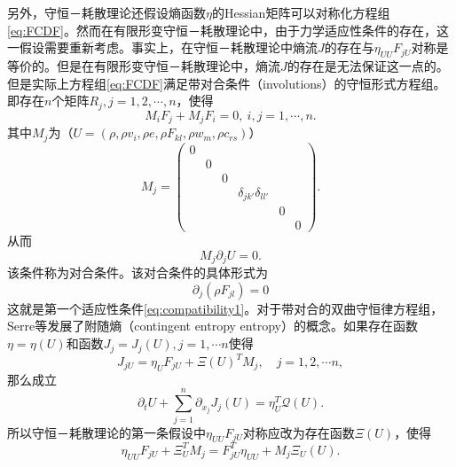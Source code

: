 
另外，守恒－耗散理论还假设熵函数$\eta$的Hessian矩阵可以对称化方程组\eqref{eq:FCDF}。然而在有限形变守恒－耗散理论中，由于力学适应性条件的存在，这一假设需要重新考虑。事实上，在守恒－耗散理论中熵流$J$的存在与$\eta_{UU}F_{jU}$对称是等价的。但是在有限形变守恒－耗散理论中，熵流$J$的存在是无法保证这一点的。但是实际上方程组\eqref{eq:FCDF}满足带对合条件（involutions）的守恒形式方程组\cite{dafermos1986quasilinear,dafermos2013non,benzoni2007multi}。即存在$n$个矩阵$R_j,j=1,2,\cdots,n$，使得
\begin{equation*}
	M_i F_{j} + M_j F_i = 0, \ i,j = 1, \cdots,n .
\end{equation*}
其中$M_j$为（$U= (\rho,\rho v_i,\rho e, \rho F_{kl},\rho w_m, \rho c_{rs})$）
\begin{equation*}
	M_{j} = \left( \begin{array}{ccccccc}
		0 \\
		& 0 \\
		& & 0 \\
		& & & \delta_{jk'}\delta_{ll'} \\
		& & & & 0 \\
		& & & & & 0
	\end{array} \right).
\end{equation*}
从而
\begin{equation}\label{eq:involutions}
	M_j \partial_j U = 0.
\end{equation}
该条件称为对合条件。该对合条件的具体形式为
\begin{equation*}
	\partial_{j} (\rho F_{jl}) = 0
\end{equation*}
这就是第一个适应性条件\eqref{eq:compatibility1}。对于带对合的双曲守恒律方程组，Serre等发展了附随熵（contingent entropy entropy）的概念。如果存在函数$\eta = \eta(U)$和函数$J_j=J_j(U),j=1, \cdots n$使得
\begin{equation*}
	J_{jU}  = \eta_U F_{jU} + \Xi(U)^T M_j,\quad j=1,2, \cdots n,
\end{equation*}
那么成立
\begin{equation*}
	\partial_t U + \sum_{j=1}^n \partial_{x_j} J_{j}(U) = \eta_U^T \mathcal{Q}(U).
\end{equation*}
所以守恒－耗散理论的第一条假设中$\eta_{UU} F_{jU}$对称应改为存在函数$\Xi(U)$，使得
\begin{equation}\label{eq:invsym}
	\eta_{UU} F_{jU} + \Xi_U^T M_j = F_{jU}^T \eta_{UU} + M_j \Xi_U(U).
\end{equation}

